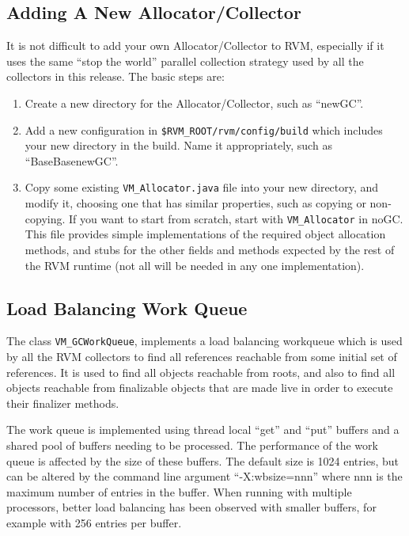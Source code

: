\subsection{Adding A New Allocator/Collector} \label{sssec:newalloc}
It is not difficult to add your own Allocator/Collector to RVM,
especially if it uses the same ``stop the world'' parallel collection
strategy used by all the collectors in this release.  The basic steps
are:
\begin{enumerate}
\item Create a new directory for the Allocator/Collector, such as ``newGC''.
\item Add a new configuration in {\tt \$RVM\_ROOT/rvm/config/build}
which includes your new directory in the build.  Name it appropriately, such as
``BaseBasenewGC''.
\item Copy some existing {\tt VM\_Allocator.java} file into your new directory,
and modify it, choosing one that has similar properties, such as copying or
non-copying.  If you want to start from scratch, start with 
{\tt VM\_Allocator} in noGC.
This file provides simple implementations of the required object allocation
methods, and stubs for the other fields and methods expected by the rest
of the RVM runtime (not all will be needed in any one implementation).
\end{enumerate}

\subsection{Load Balancing Work Queue} \label{sssec:workqueue}
The class {\tt VM\_GCWorkQueue}, implements a load balancing workqueue
which is used by all the RVM collectors to find all references reachable from
some initial set of references.  It is used to find all objects reachable
from roots, and also to find all objects reachable from finalizable objects
that are made live in order to execute their finalizer methods.

The work queue is implemented using thread local ``get'' and ``put'' buffers
and a shared pool of buffers needing to be processed.  The performance of the
work queue is affected by the size of these buffers.  The default size is 1024 
entries, but can be altered by the command line argument ``-X:wbsize=nnn'' where
nnn is the maximum number of entries in the buffer.  When running with multiple
processors, better load balancing has been observed with smaller buffers, for
example with 256 entries per buffer.  

